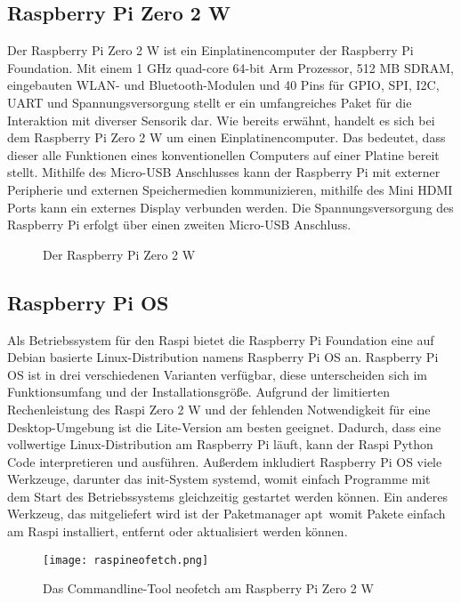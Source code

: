 \subsection{Raspberry Pi Zero 2 W}
\label{subsec:tRasPi}
Der Raspberry Pi Zero 2 W ist ein Einplatinencomputer der Raspberry Pi Foundation. Mit einem 1 \ac{GHz} quad-core 64-bit Arm Prozessor, 512 \ac{MB} \ac{SDRAM}, eingebauten \ac{WLAN}- und Bluetooth-Modulen und 40 Pins für \ac{GPIO}, \ac{SPI}, \ac{I2C}, \ac{UART} und Spannungsversorgung stellt er ein umfangreiches Paket für die Interaktion mit diverser Sensorik dar. Wie bereits erwähnt, handelt es sich bei dem Raspberry Pi Zero 2 W um einen Einplatinencomputer. Das bedeutet, dass dieser alle Funktionen eines konventionellen Computers auf einer Platine bereit stellt. Mithilfe des Micro-\ac{USB} Anschlusses kann der Raspberry Pi mit externer Peripherie und externen Speichermedien kommunizieren, mithilfe des Mini \ac{HDMI} Ports kann ein externes Display verbunden werden. Die Spannungsversorgung des Raspberry Pi erfolgt über einen zweiten Micro-\ac{USB} Anschluss.
\begin{figure}[h]
\centering
\missingfigure{}
\caption{Der Raspberry Pi Zero 2 W}
\label{fig:RaspberryPiZero2W}
\end{figure}

\subsection{Raspberry Pi OS}
\label{subsec:tRasPiOS}
Als Betriebssystem für den \ac{Raspi} bietet die Raspberry Pi Foundation eine auf Debian basierte Linux-Distribution namens Raspberry Pi \ac{OS} an. Raspberry Pi \ac{OS} ist in drei verschiedenen Varianten verfügbar, diese unterscheiden sich im Funktionsumfang und der Installationsgröße. Aufgrund der limitierten Rechenleistung des \ac{Raspi} Zero 2 W und der fehlenden Notwendigkeit für eine Desktop-Umgebung ist die Lite-Version am besten geeignet. Dadurch, dass eine vollwertige Linux-Distribution am Raspberry Pi läuft, kann der \ac{Raspi} Python Code interpretieren und ausführen. Außerdem inkludiert Raspberry Pi OS viele Werkzeuge, darunter das init-System \glqq systemd\grqq , womit einfach Programme mit dem Start des Betriebssystems gleichzeitig gestartet werden können. Ein anderes Werkzeug, das mitgeliefert wird ist der Paketmanager \glqq apt\grqq\ womit Pakete einfach am \ac{Raspi} installiert, entfernt oder aktualisiert werden können.
\begin{figure}[h]
\centering
\texttt{[image: raspineofetch.png]}
\caption{Das Commandline-Tool neofetch am Raspberry Pi Zero 2 W}
\label{fig:pineofetch}
\end{figure}

